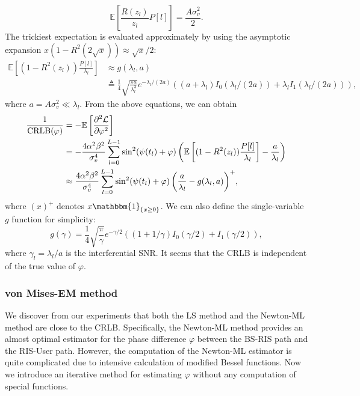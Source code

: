 \documentclass[12pt,draftclsnofoot,journal,onecolumn]{IEEEtran}
\theoremstyle{nonumberplain}
\begin{document}
    \begin{equation}
        \mathbb{E}\left[\frac{R(z_l)}{z_l} P[l]\right] = \frac{A\sigma_v^2}{2}.
    \end{equation}
    The trickiest expectation is evaluated approximately by using the asymptotic expansion $x(1-R^2(2\sqrt{x})) \approx \sqrt{x}/2$:
    \begin{equation}
        \begin{aligned}
            \mathbb{E}\left[(1-R^2(z_l))\frac{P[l]}{\lambda_l}\right] & \approx g(\lambda_l, a) \\ 
            & \triangleq  \frac{1}{4}\sqrt{\frac{\pi a}{\lambda_l^3}}e^{-\lambda_l/(2a)}\left((a+\lambda_l)I_0(\lambda_l/(2a))+\lambda_l I_1(\lambda_l/(2a))\right),
        \end{aligned}
    \end{equation}
    where $a=A\sigma_v^2 \ll \lambda_l$. From the above equations, we can obtain
    \begin{equation}
        \begin{aligned}
        \frac{1}{{\rm CRLB}(\varphi)} & = -\mathbb{E}\left[\frac{\partial^2\mathcal{L}}{\partial\varphi^2}\right] \\
        & =  -\frac{4\alpha^2\beta^2}{\sigma_v^4}\sum_{l=0}^{L-1}{ \sin^2(\psi(t_l)+\varphi) \left(\mathbb{E}\left[(1-R^2(z_l))\frac{P[l]}{\lambda_l}\right] - \frac{a}{\lambda_l}\right) } \\
        & \approx \frac{4\alpha^2\beta^2}{\sigma_v^4}\sum_{l=0}^{L-1}{ \sin^2(\psi(t_l)+\varphi) \left(\frac{a}{\lambda_l}-g(\lambda_l, a)\right)^{+} },
        \end{aligned}
        \label{eqn:CRLB}
    \end{equation}
    where $(x)^{+}$ denotes $x \mathbbm{1}_{\{x \ge 0\}}$. We can also define the single-variable $g$ function for simplicity:
    \begin{equation}
        g(\gamma) = \frac{1}{4} \sqrt{\frac{\pi}{\gamma}}e^{-\gamma/2}\left((1+1/\gamma)I_0(\gamma/2) + I_1(\gamma/2)\right),
    \end{equation}
    where $\gamma_l = \lambda_l / a$ is the interferential SNR. It seems that the CRLB is independent of the true value of $\varphi$.

\subsubsection{von Mises-EM method}
    We discover from our experiments that both the LS method and the Newton-ML method are close to the CRLB. Specifically, the Newton-ML method provides an almost optimal estimator for the phase difference $\varphi$ between the BS-RIS path and the RIS-User path. However, the computation of the Newton-ML estimator is quite complicated due to intensive calculation of modified Bessel functions. Now we introduce an iterative method for estimating $\varphi$ without any computation of special functions.
\end{document}
